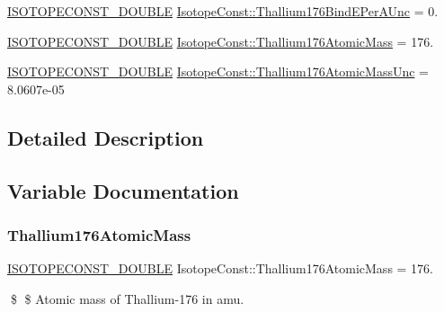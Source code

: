 \begin{DoxyCompactItemize}
\mbox{\hyperlink{group___isotope_const-_macros_ga8f45a7272ce02c0b4c65c44636ed719a}{I\+S\+O\+T\+O\+P\+E\+C\+O\+N\+S\+T\+\_\+\+D\+O\+U\+B\+LE}} \mbox{\hyperlink{group___isotope_const-_thallium-_tl176_gac6d9759e86ee735cf7c77fe2d11eedfc}{Isotope\+Const\+::\+Thallium176\+Bind\+E\+Per\+A\+Unc}} = 0.
\item 
\mbox{\hyperlink{group___isotope_const-_macros_ga8f45a7272ce02c0b4c65c44636ed719a}{I\+S\+O\+T\+O\+P\+E\+C\+O\+N\+S\+T\+\_\+\+D\+O\+U\+B\+LE}} \mbox{\hyperlink{group___isotope_const-_thallium-_tl176_ga6ea99786922ebc25e764ce24227e85d5}{Isotope\+Const\+::\+Thallium176\+Atomic\+Mass}} = 176.
\item 
\mbox{\hyperlink{group___isotope_const-_macros_ga8f45a7272ce02c0b4c65c44636ed719a}{I\+S\+O\+T\+O\+P\+E\+C\+O\+N\+S\+T\+\_\+\+D\+O\+U\+B\+LE}} \mbox{\hyperlink{group___isotope_const-_thallium-_tl176_gaba011fc557fec58cf7991778463c71d3}{Isotope\+Const\+::\+Thallium176\+Atomic\+Mass\+Unc}} = 8.\+0607e-\/05
\end{DoxyCompactItemize}


\subsection{Detailed Description}


\subsection{Variable Documentation}
\mbox{\label{group___isotope_const-_thallium-_tl176_ga6ea99786922ebc25e764ce24227e85d5}} 
\subsubsection{\texorpdfstring{Thallium176\+Atomic\+Mass}{Thallium176AtomicMass}}
{\footnotesize\ttfamily \mbox{\hyperlink{group___isotope_const-_macros_ga8f45a7272ce02c0b4c65c44636ed719a}{I\+S\+O\+T\+O\+P\+E\+C\+O\+N\+S\+T\+\_\+\+D\+O\+U\+B\+LE}} Isotope\+Const\+::\+Thallium176\+Atomic\+Mass = 176.}

\$ \$ Atomic mass of Thallium-\/176 in amu. \mbox{\label{group___isotope_const-_thallium-_tl176_gaba011fc557fec58cf7991778463c71d3}} 

